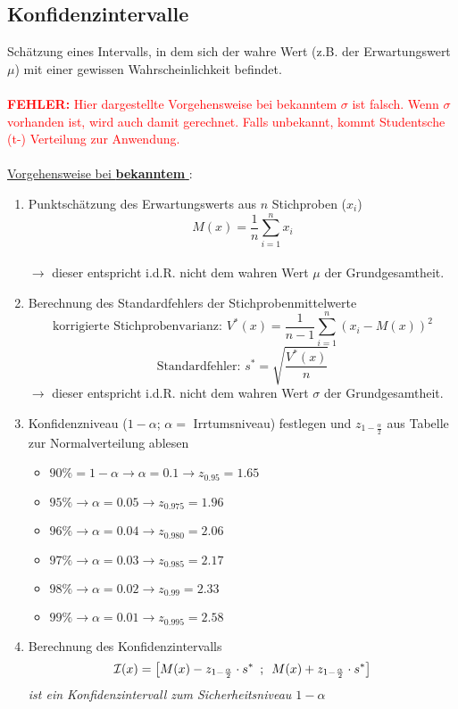 \subsection{Konfidenzintervalle}

Schätzung eines Intervalls, in dem sich der wahre Wert (z.B. der Erwartungswert~\(\mu\)) mit einer gewissen Wahrscheinlichkeit befindet.
\\\\
\textcolor{red}{\textbf{FEHLER:}}
\textcolor{red}{Hier dargestellte Vorgehensweise bei bekanntem \(\sigma\) ist falsch. Wenn \(\sigma\) vorhanden ist, wird auch damit gerechnet. Falls unbekannt, kommt Studentsche (t-) Verteilung zur Anwendung.}\\\\
\underline{Vorgehensweise bei \textbf{bekanntem} \boldmath{\(\sigma\)}}:
\begin{enumerate}
    \item Punktschätzung des Erwartungswerts aus \(n\) Stichproben (\(x_i\))
            \[M(x)=\frac{1}{n}\sum_{i=1}^{n}x_i\]\\
            \(\rightarrow\) dieser entspricht i.d.R. nicht dem wahren Wert \(\mu\) der Grundgesamtheit.
    \item Berechnung des Standardfehlers der Stichprobenmittelwerte
            \[\text{korrigierte Stichprobenvarianz: }V^*(x)=\frac{1}{n-1}\sum_{i=1}^{n}(x_i-M(x))^2\]
            \[\text{Standardfehler: }s^*=\sqrt{\frac{V^*(x)}{n}}\]
            \(\rightarrow\) dieser entspricht i.d.R. nicht dem wahren Wert \(\sigma\) der Grundgesamtheit.
    \item Konfidenzniveau (\(1-\alpha\); \(\alpha=\) Irrtumsniveau) festlegen und \(z_{1-\frac{\alpha}{2}}\) aus Tabelle zur Normalverteilung ablesen
        \begin{itemize}
            \item \(90\% = 1-\alpha \rightarrow \alpha=0.1\rightarrow z_{0.95}=1.65\)
            \item \(95\% \rightarrow \alpha=0.05\rightarrow z_{0.975}=1.96\)
            \item \(96\% \rightarrow \alpha=0.04\rightarrow z_{0.980}=2.06\)
            \item \(97\% \rightarrow \alpha=0.03\rightarrow z_{0.985}=2.17\)
            \item \(98\% \rightarrow \alpha=0.02\rightarrow z_{0.99}=2.33\)
            \item \(99\% \rightarrow \alpha=0.01\rightarrow z_{0.995}=2.58\)
        \end{itemize}
    \item Berechnung des Konfidenzintervalls
    \begin{equation*}
        \mathcal{I}(x) = \left[M(x) - z_{1-\frac{\alpha}{2}} \cdot s^*\hspace{0.5em}; \hspace{0.5em}M(x) + z_{1-\frac{\alpha}{2}} \cdot s^*\right]
    \end{equation*}
    \emph{ist ein Konfidenzintervall zum Sicherheitsniveau \(1-\alpha\)}\\
\end{enumerate}

